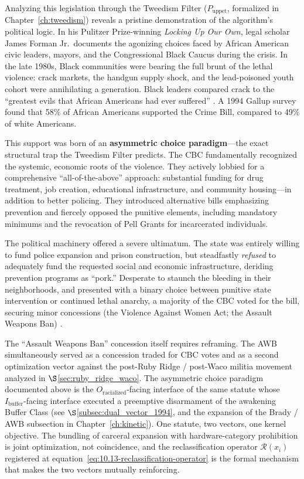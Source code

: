 Analyzing this legislation through the Tweedism Filter ($P_{\text{uppet}}$, formalized in Chapter~\ref{ch:tweedism}) reveals a pristine demonstration of the algorithm's political logic. In his Pulitzer Prize-winning \textit{Locking Up Our Own}, legal scholar James Forman Jr.\ documents the agonizing choices faced by African American civic leaders, mayors, and the Congressional Black Caucus during the crisis. In the late 1980s, Black communities were bearing the full brunt of the lethal violence: crack markets, the handgun supply shock, and the lead-poisoned youth cohort were annihilating a generation. Black leaders compared crack to the ``greatest evils that African Americans had ever suffered'' \cite{forman}. A 1994 Gallup survey found that 58\% of African Americans supported the Crime Bill, compared to 49\% of white Americans.

This support was born of an \textbf{asymmetric choice paradigm}---the exact structural trap the Tweedism Filter predicts. The CBC fundamentally recognized the systemic, economic roots of the violence. They actively lobbied for a comprehensive ``all-of-the-above'' approach: substantial funding for drug treatment, job creation, educational infrastructure, and community housing---in addition to better policing. They introduced alternative bills emphasizing prevention and fiercely opposed the punitive elements, including mandatory minimums and the revocation of Pell Grants for incarcerated individuals.

The political machinery offered a severe ultimatum. The state was entirely willing to fund police expansion and prison construction, but steadfastly \textit{refused} to adequately fund the requested social and economic infrastructure, deriding prevention programs as ``pork.'' Desperate to staunch the bleeding in their neighborhoods, and presented with a binary choice between punitive state intervention or continued lethal anarchy, a majority of the CBC voted for the bill, securing minor concessions (the Violence Against Women Act; the Assault Weapons Ban) \cite{forman}.

The ``Assault Weapons Ban'' concession itself requires reframing. The AWB simultaneously served as a concession traded for CBC votes and as a second optimization vector against the post-Ruby Ridge / post-Waco militia movement analyzed in $\S$\ref{sec:ruby_ridge_waco}. The asymmetric choice paradigm documented above is the $O_{\text{racialized}}$-facing interface of the same statute whose $I_{\text{buffer}}$-facing interface executed a preemptive disarmament of the awakening Buffer Class (see $\S$\ref{subsec:dual_vector_1994}, and the expansion of the Brady / AWB subsection in Chapter~\ref{ch:kinetic}). One statute, two vectors, one kernel objective. The bundling of carceral expansion with hardware-category prohibition is joint optimization, not coincidence, and the reclassification operator $\mathcal{R}(x_i)$ registered at equation~\eqref{eq:10.13-reclassification-operator} is the formal mechanism that makes the two vectors mutually reinforcing.

